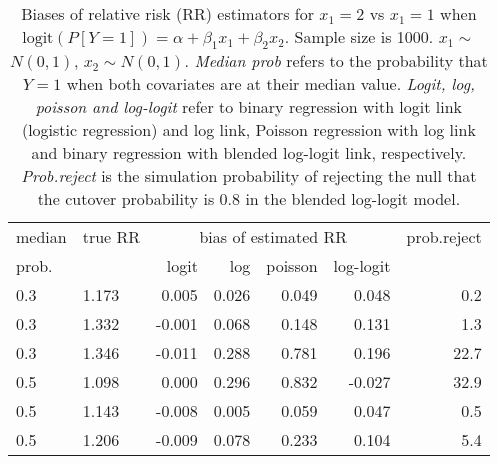 \documentclass[12pt,a4paper]{article}
\begin{document}
\begin{table}[H] 
\small\sf\centering 
\caption{Biases of relative risk (RR) estimators for $x_1=2$ vs $x_1=1$ when $\mbox{logit}(P[Y=1])=\alpha+\beta_1 x_1 + \beta_2 x_2$. Sample size is 1000. $x_1 \sim $$N(0,1)$, $x_2 \sim N(0,1)$. {\it Median prob} refers to the probability that $Y=1$ when both covariates are at their median value. {\it Logit, log, poisson and log-logit} refer to binary regression with logit link (logistic regression) and log link, Poisson regression with log link and binary regression with blended log-logit link, respectively. {\it Prob.reject} is the simulation probability of rejecting the null that the cutover probability is $0.8$ in the blended log-logit model.} 
\begin{tabular}{llrrrrr} 
\toprule 
median & true RR & \multicolumn{4}{c}{bias of estimated RR} & prob.reject \\ 
prob. & & logit & log & poisson & log-logit  & \\ \midrule 
0.3 & 1.173 &  0.005 & 0.026 & 0.049 &  0.048 &  0.2 \\  
0.3 & 1.332 & -0.001 & 0.068 & 0.148 &  0.131 &  1.3 \\  
0.3 & 1.346 & -0.011 & 0.288 & 0.781 &  0.196 & 22.7 \\  
0.5 & 1.098 &  0.000 & 0.296 & 0.832 & -0.027 & 32.9 \\  
0.5 & 1.143 & -0.008 & 0.005 & 0.059 &  0.047 &  0.5 \\  
0.5 & 1.206 & -0.009 & 0.078 & 0.233 &  0.104 &  5.4 \\  
\bottomrule 
\end{tabular} 
\end{table} 
\end{document}
